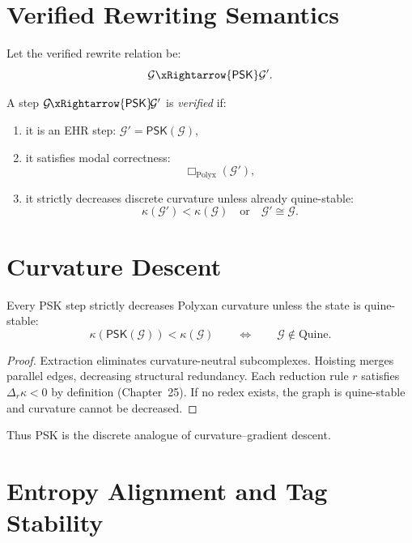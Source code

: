 \section{Verified Rewriting Semantics}

Let the verified rewrite relation be:
\[
\mathcal{G} \xRightarrow{\mathsf{PSK}} \mathcal{G}'.
\]

\begin{definition}\label{def:verified-PSK}
A step $\mathcal{G}\!\xRightarrow{\mathsf{PSK}}\!\mathcal{G}'$ is \emph{verified} if:
\begin{enumerate}
    \item it is an EHR step: $\mathcal{G}' = \mathsf{PSK}(\mathcal{G})$,
    \item it satisfies modal correctness:
    \[
    \Box_{\mathrm{Polyx}}(\mathcal{G}'),
    \]
    \item it strictly decreases discrete curvature unless already quine-stable:
    \[
    \kappa(\mathcal{G}') < \kappa(\mathcal{G})
    \quad\text{or}\quad
    \mathcal{G}' \cong \mathcal{G}.
    \]
\end{enumerate}
\end{definition}

\section{Curvature Descent}

\begin{theorem}\label{thm:48-descent}
Every PSK step strictly decreases Polyxan curvature unless the state is quine-stable:
\[
\kappa(\mathsf{PSK}(\mathcal{G})) < \kappa(\mathcal{G})
\qquad\Longleftrightarrow\qquad
\mathcal{G} \notin \mathrm{Quine}.
\]
\end{theorem}

\begin{proof}
Extraction eliminates curvature-neutral subcomplexes.
Hoisting merges parallel edges, decreasing structural redundancy.
Each reduction rule $r$ satisfies $\Delta_r\kappa < 0$ by definition (Chapter~25).
If no redex exists, the graph is quine-stable and curvature cannot be decreased.
\end{proof}

Thus PSK is the discrete analogue of curvature–gradient descent.

\section{Entropy Alignment and Tag Stability}

